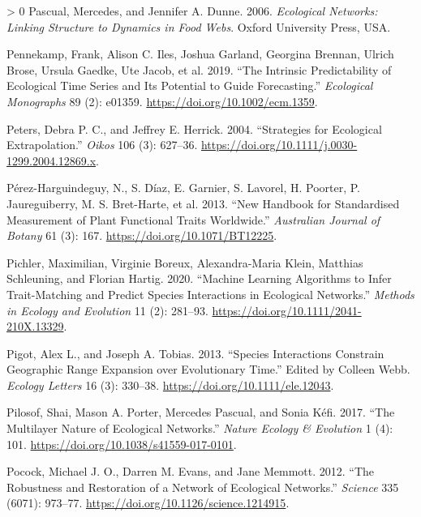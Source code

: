 \documentclass[10pt,oneside]{article}
\newlength{\cslhangindent}
\newenvironment{CSLReferences}[3] %
 {%
  \setlength{\parindent}{0pt}
  \ifodd #1 \everypar{\setlength{\hangindent}{\cslhangindent}}\ignorespaces\fi
  \ifnum #2 > 0
  \setlength{\parskip}{#2\baselineskip}
  \fi
 }%
 {}
\begin{document}
\begin{CSLReferences}{1}{0}
\leavevmode\hypertarget{ref-Pascual2006EcoNet}{}%
Pascual, Mercedes, and Jennifer A. Dunne. 2006. \emph{Ecological
Networks: Linking Structure to Dynamics in Food Webs}. Oxford University
Press, USA.

\leavevmode\hypertarget{ref-Pennekamp2019IntPre}{}%
Pennekamp, Frank, Alison C. Iles, Joshua Garland, Georgina Brennan,
Ulrich Brose, Ursula Gaedke, Ute Jacob, et al. 2019. {``The Intrinsic
Predictability of Ecological Time Series and Its Potential to Guide
Forecasting.''} \emph{Ecological Monographs} 89 (2): e01359.
\url{https://doi.org/10.1002/ecm.1359}.

\leavevmode\hypertarget{ref-Peters2004StrEco}{}%
Peters, Debra P. C., and Jeffrey E. Herrick. 2004. {``Strategies for
Ecological Extrapolation.''} \emph{Oikos} 106 (3): 627--36.
\url{https://doi.org/10.1111/j.0030-1299.2004.12869.x}.

\leavevmode\hypertarget{ref-Perez-Harguindeguy2013NewHan}{}%
Pérez-Harguindeguy, N., S. Díaz, E. Garnier, S. Lavorel, H. Poorter, P.
Jaureguiberry, M. S. Bret-Harte, et al. 2013. {``New Handbook for
Standardised Measurement of Plant Functional Traits Worldwide.''}
\emph{Australian Journal of Botany} 61 (3): 167.
\url{https://doi.org/10.1071/BT12225}.

\leavevmode\hypertarget{ref-Pichler2020MacLea}{}%
Pichler, Maximilian, Virginie Boreux, Alexandra-Maria Klein, Matthias
Schleuning, and Florian Hartig. 2020. {``Machine Learning Algorithms to
Infer Trait-Matching and Predict Species Interactions in Ecological
Networks.''} \emph{Methods in Ecology and Evolution} 11 (2): 281--93.
\url{https://doi.org/10.1111/2041-210X.13329}.

\leavevmode\hypertarget{ref-Pigot2013SpeInt}{}%
Pigot, Alex L., and Joseph A. Tobias. 2013. {``Species Interactions
Constrain Geographic Range Expansion over Evolutionary Time.''} Edited
by Colleen Webb. \emph{Ecology Letters} 16 (3): 330--38.
\url{https://doi.org/10.1111/ele.12043}.

\leavevmode\hypertarget{ref-Pilosof2017MulNat}{}%
Pilosof, Shai, Mason A. Porter, Mercedes Pascual, and Sonia Kéfi. 2017.
{``The Multilayer Nature of Ecological Networks.''} \emph{Nature Ecology
\& Evolution} 1 (4): 101. \url{https://doi.org/10.1038/s41559-017-0101}.

\leavevmode\hypertarget{ref-Pocock2012RobRes}{}%
Pocock, Michael J. O., Darren M. Evans, and Jane Memmott. 2012. {``The
Robustness and Restoration of a Network of Ecological Networks.''}
\emph{Science} 335 (6071): 973--77.
\url{https://doi.org/10.1126/science.1214915}.


\end{CSLReferences}
\end{document}
